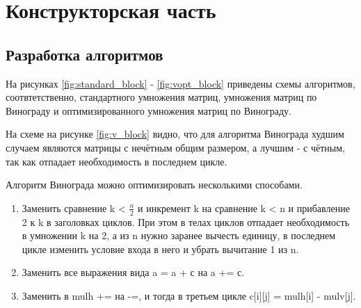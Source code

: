 \chapter{Конструкторская часть}


\section{Разработка алгоритмов}

На рисунках \ref{fig:standard_block} -  \ref{fig:vopt_block} приведены схемы алгоритмов, соотвтетственно, стандартного умножения матриц, умножения матриц по Винограду и оптимизированного умножения матриц по Винограду.

На схеме на рисунке \ref{fig:v_block} видно, что для алгоритма Винограда худшим случаем являются матрицы с нечётным общим размером, а лучшим - с чётным, так как отпадает необходимость в последнем цикле.

Алгоритм Винограда можно оптимизировать несколькими способами.
\begin{enumerate}[label={\arabic*)}]
	\item Заменить сравнение k < $\frac{n}{2}$ и инкремент k на сравнение k < n и прибавление 2 к k в заголовках циклов. При этом в телах циклов отпадает необходимость в умножении k на 2, а из n нужно заранее вычесть единицу, в последнем цикле изменить условие входа в него и убрать вычитание 1 из n.  
	\item Заменить все выражения вида a = a + с на a += с.
	\item Заменить в mulh += на -=, и тогда в третьем цикле  c[i][j] = mulh[i] - mulv[j].
\end{enumerate}

\clearpage

